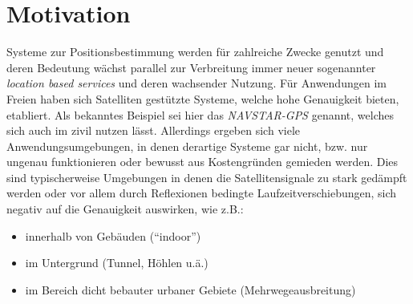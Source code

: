 \section{Motivation}
\label{sec:motivation}

Systeme zur Positionsbestimmung werden für zahlreiche Zwecke genutzt und deren Bedeutung wächst parallel zur
Verbreitung immer neuer sogenannter \textit{location based services} und deren wachsender Nutzung.
Für Anwendungen im Freien haben sich Satelliten gestützte Systeme, welche hohe Genauigkeit bieten, etabliert.
Als bekanntes Beispiel sei hier das \textit{NAVSTAR-GPS} genannt, welches sich auch im zivil nutzen lässt.
Allerdings ergeben sich viele Anwendungsumgebungen, in denen derartige Systeme gar nicht, bzw.
nur ungenau funktionieren oder bewusst aus Kostengründen gemieden werden. 
Dies sind typischerweise Umgebungen in denen die Satellitensignale zu stark gedämpft werden oder
vor allem durch Reflexionen bedingte Laufzeitverschiebungen, sich negativ auf die Genauigkeit auswirken, wie z.B.: 


\begin{itemize}
  \item innerhalb von Gebäuden (``indoor'')
  \item im Untergrund (Tunnel, Höhlen u.ä.)
  \item im Bereich dicht bebauter urbaner Gebiete (Mehrwegeausbreitung)
\end{itemize}

